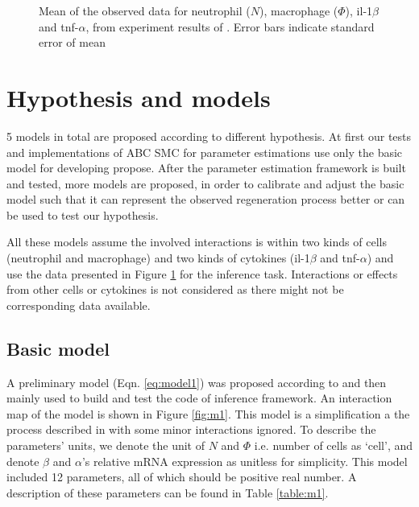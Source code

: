 \begin{figure}
    \begin{center}
    \end{center}

    \caption[Mean of the observed data]%
    {Mean of the observed data for neutrophil ($N$), macrophage ($\Phi$), il-1$\beta$ and tnf-$\alpha$, from experiment results of \cite{ref:Tsarouchas}. Error bars indicate standard error of mean}
    \label{fig:obs_data}

\end{figure}

\section{Hypothesis and models}

5 models in total are proposed according to different hypothesis. At first our tests and implementations of ABC SMC for parameter estimations use only the basic model for developing propose. After the parameter estimation framework is built and tested, more models are proposed, in order to calibrate and adjust the basic model such that it can represent the observed regeneration process better or can be used to test our hypothesis.

All these models assume the involved interactions is within two kinds of cells (neutrophil and macrophage) and two kinds of cytokines (il-1$\beta$ and tnf-$\alpha$) and use the data presented in Figure \ref{fig:obs_data} for the inference task. Interactions or effects from other cells or cytokines is not considered as there might not be corresponding data available.

\subsection{Basic model}

A preliminary model (Eqn. \ref{eq:model1}) was proposed according to \cite{ref:Tsarouchas} and then mainly used to build and test the code of inference framework. An interaction map of the model is shown in Figure \ref{fig:m1}. This model is a simplification a the process described in \cite{ref:Tsarouchas} with some minor interactions ignored. To describe the parameters' units, we denote the unit of $N$ and $\Phi$ i.e. number of cells as `cell', and denote $\beta$ and $\alpha$'s relative mRNA expression as unitless for simplicity. This model included 12 parameters, all of which should be positive real number. A description of these parameters can be found in Table \ref{table:m1}.

